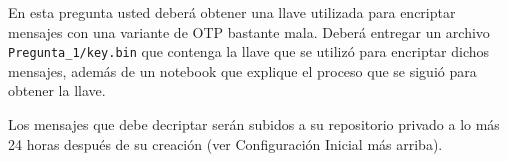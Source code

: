 
En esta pregunta usted deberá obtener una llave utilizada para encriptar mensajes con una variante de OTP bastante mala. Deberá entregar un archivo \texttt{Pregunta\_1/key.bin} que contenga la llave que se utilizó para encriptar dichos mensajes, además de un notebook que explique el proceso que se siguió para obtener la llave.

Los mensajes que debe decriptar serán subidos a su repositorio privado a lo más 24 horas después de su creación (ver Configuración Inicial más arriba).
